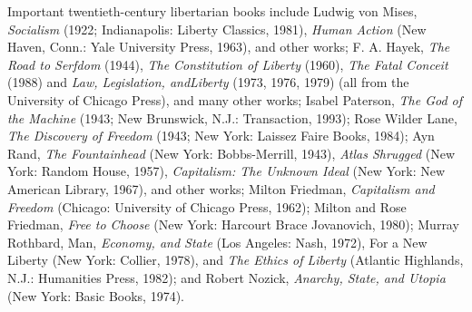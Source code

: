 Important twentieth-century libertarian books include Ludwig von
Mises, \textit{Socialism} (1922; Indianapolis: Liberty Classics, 1981), \textit{Human Action}
(New Haven, Conn.: Yale University Press, 1963), and other works; F. A.
Hayek, \textit{The Road to Serfdom} (1944), \textit{The Constitution of Liberty} (1960), \textit{The
Fatal Conceit} (1988) and \textit{Law, Legislation, andLiberty} (1973, 1976, 1979) (all
from the University of Chicago Press), and many other works; Isabel Paterson, \textit{The God of the Machine} (1943; New Brunswick, N.J.: Transaction,
1993); Rose Wilder Lane, \textit{The Discovery of Freedom} (1943; New York: Laissez
Faire Books, 1984); Ayn Rand, \textit{The Fountainhead} (New York: Bobbs-Merrill, 1943), \textit{Atlas Shrugged} (New York: Random House, 1957), \textit{Capitalism:
The Unknown Ideal} (New York: New American Library, 1967), and other
works; Milton Friedman, \textit{Capitalism and Freedom} (Chicago: University of
Chicago Press, 1962); Milton and Rose Friedman, \textit{Free to Choose} (New York:
Harcourt Brace Jovanovich, 1980); Murray Rothbard, Man, \textit{Economy, and
State} (Los Angeles: Nash, 1972), For a New Liberty (New York: Collier,
1978), and \textit{The Ethics of Liberty} (Atlantic Highlands, N.J.: Humanities
Press, 1982); and Robert Nozick, \textit{Anarchy, State, and Utopia} (New York: Basic Books, 1974).

